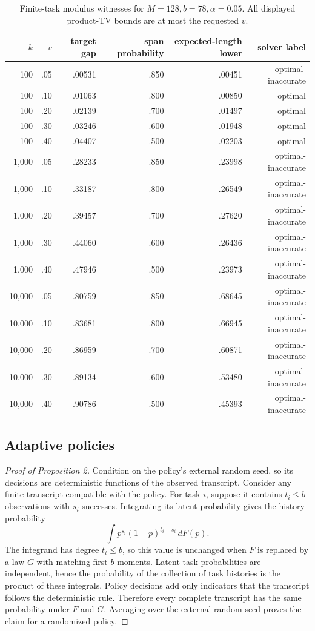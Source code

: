 \documentclass[twoside]{article}
\begin{document}
\begin{table}[t]
\caption{Finite-task modulus witnesses for \(M=128,b=78,\alpha=0.05\).
All displayed product-TV bounds are at most the requested \(v\).}
\label{tab:modulus-full}
\centering
\small
\begin{tabular}{rrrrrr}
\toprule
\(k\) & \(v\) & target gap & span probability & expected-length lower & solver label\\
\midrule
100 & .05 & .00531 & .850 & .00451 & optimal-inaccurate\\
100 & .10 & .01063 & .800 & .00850 & optimal\\
100 & .20 & .02139 & .700 & .01497 & optimal\\
100 & .30 & .03246 & .600 & .01948 & optimal\\
100 & .40 & .04407 & .500 & .02203 & optimal\\
\midrule
1,000 & .05 & .28233 & .850 & .23998 & optimal-inaccurate\\
1,000 & .10 & .33187 & .800 & .26549 & optimal-inaccurate\\
1,000 & .20 & .39457 & .700 & .27620 & optimal-inaccurate\\
1,000 & .30 & .44060 & .600 & .26436 & optimal-inaccurate\\
1,000 & .40 & .47946 & .500 & .23973 & optimal-inaccurate\\
\midrule
10,000 & .05 & .80759 & .850 & .68645 & optimal-inaccurate\\
10,000 & .10 & .83681 & .800 & .66945 & optimal-inaccurate\\
10,000 & .20 & .86959 & .700 & .60871 & optimal-inaccurate\\
10,000 & .30 & .89134 & .600 & .53480 & optimal-inaccurate\\
10,000 & .40 & .90786 & .500 & .45393 & optimal-inaccurate\\
\bottomrule
\end{tabular}
\end{table}

\subsection{Adaptive policies}

\begin{proof}[Proof of Proposition 2]
Condition on the policy's external random seed, so its decisions are
deterministic functions of the observed transcript. Consider any finite
transcript compatible with the policy. For task \(i\), suppose it contains
\(t_i\leq b\) observations with \(s_i\) successes. Integrating its latent
probability gives the history probability
\[
 \int p^{s_i}(1-p)^{t_i-s_i}\,dF(p).
\]
The integrand has degree \(t_i\leq b\), so this value is unchanged when
\(F\) is replaced by a law \(G\) with matching first \(b\) moments. Latent
task probabilities are independent, hence the probability of the collection
of task histories is the product of these integrals. Policy decisions add
only indicators that the transcript follows the deterministic rule.
Therefore every complete transcript has the same probability under \(F\)
and \(G\). Averaging over the external random seed proves the claim for a
randomized policy.
\end{proof}
\end{document}
